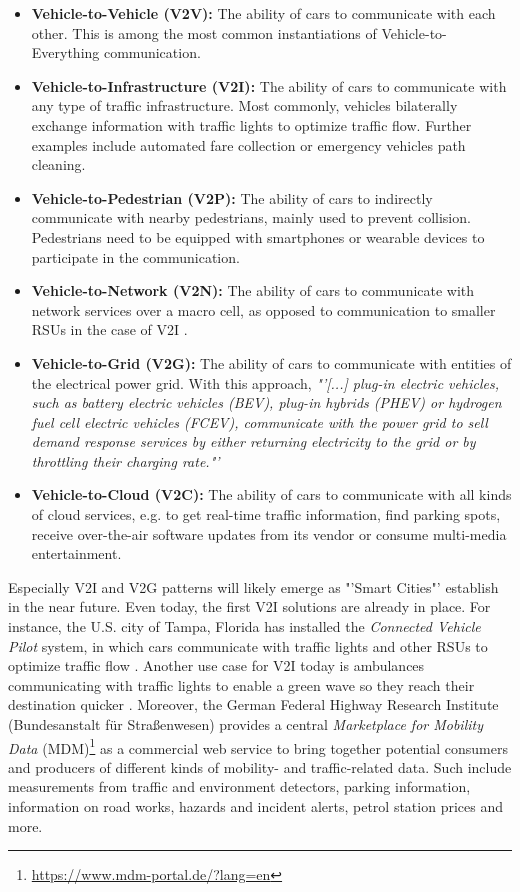 \begin{itemize}
	\item \textbf{Vehicle-to-Vehicle (V2V):} The ability of cars to communicate with each other. This is among the most common instantiations of Vehicle-to-Everything communication. 
	\item  \textbf{Vehicle-to-Infrastructure (V2I):} The ability of cars to communicate with any type of traffic infrastructure. Most commonly, vehicles bilaterally exchange information with traffic lights to optimize traffic flow. Further examples include automated fare collection or emergency vehicles path cleaning.
	\item \textbf{Vehicle-to-Pedestrian (V2P):} The ability of cars to indirectly communicate with nearby pedestrians, mainly used to prevent collision. Pedestrians need to be equipped with smartphones or wearable devices to participate in the communication.
	\item \textbf{Vehicle-to-Network (V2N):} The ability of cars to communicate with network services over a macro cell, as opposed to communication to smaller RSUs in the case of V2I \cite{Abou-zeid19}. 
	\item \textbf{Vehicle-to-Grid (V2G):} The ability of cars to communicate with entities of the electrical power grid. With this approach, \textit{"'[...] plug-in electric vehicles, such as battery electric vehicles (BEV), plug-in hybrids (PHEV) or hydrogen fuel cell electric vehicles (FCEV), communicate with the power grid to sell demand response services by either returning electricity to the grid or by throttling their charging rate."'} \cite{wiki:v2g}
	\item \textbf{Vehicle-to-Cloud (V2C):} The ability of cars to communicate with all kinds of cloud services, e.g. to get real-time traffic information, find parking spots, receive over-the-air software updates from its vendor or consume multi-media entertainment.
\end{itemize}

Especially V2I and V2G patterns will likely emerge as "'Smart Cities"' establish in the near future. Even today, the first V2I solutions are already in place. For instance, the U.S. city of Tampa, Florida has installed the \textit{Connected Vehicle Pilot} system, in which cars communicate with traffic lights and other RSUs to optimize traffic flow \cite{TampaHillsboroughExpresswayAuthority2018}. Another use case for V2I today is ambulances communicating with traffic lights to enable a green wave so they reach their destination quicker \cite{IsrealHomelandSecurity2019}. Moreover, the German Federal Highway Research Institute (Bundesanstalt für Straßenwesen) provides a central \textit{Marketplace for Mobility Data} (MDM)\footnote{\url{https://www.mdm-portal.de/?lang=en}} as a commercial web service to bring together potential consumers and producers of different kinds of mobility- and traffic-related data. Such include measurements from traffic and environment detectors, parking information, information on road works, hazards and incident alerts, petrol station prices and more.
\par
\bigskip

